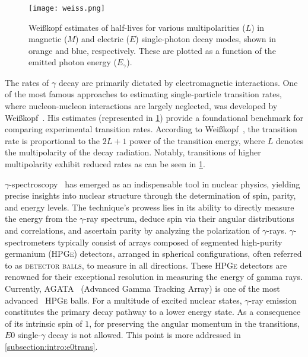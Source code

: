 \begin{figure}[hbt]
    \centering
    \texttt{[image: weiss.png]}
    \caption{Weißkopf estimates of half-lives for various multipolarities ($L$) in magnetic ($M$) and electric ($E$) single-photon decay modes, shown in orange and blue, respectively. These are plotted as a function of the emitted photon energy ($E_\gamma$).}
    \label{fig:intro:Weiss}
\end{figure}

The rates of $\gamma$ decay are primarily dictated by electromagnetic interactions. One of the most famous approaches to estimating single-particle transition rates, where nucleon-nucleon interactions are largely neglected, was developed by Weißkopf~\cite{WeisskopfTransitions}. His estimates (represented in \cref{fig:intro:Weiss}) provide a foundational benchmark for comparing experimental transition rates. According to Weißkopf~\cite{WeisskopfTransitions}, the transition rate is proportional to the $2L+1$ power of the transition energy, where $L$ denotes the 
multipolarity of the decay radiation. Notably, transitions of higher multipolarity exhibit reduced rates as can be seen in \cref{fig:intro:Weiss}.


$\gamma$-spectroscopy~\cite{Gilmore2008} has emerged as an indispensable tool in nuclear physics, yielding precise insights into nuclear structure through the determination of spin, parity, and energy levels. The technique's prowess lies in its ability to directly measure the energy from the $\gamma$-ray spectrum, deduce spin via their angular distributions and correlations, and ascertain parity by analyzing the polarization of $\gamma$-rays. 
$\gamma$-spectrometers typically consist of arrays composed of segmented high-purity germanium (\textsc{HPGe}) detectors, arranged in spherical configurations, often referred to as \textsc{detector balls}, to measure in all directions. These \textsc{HPGe} detectors are renowned for their exceptional resolution in measuring the energy of gamma rays. Currently, \textsc{AGATA}~\cite{AGATA} (Advanced Gamma Tracking Array) is one of the most advanced~\cite{KortenAGATA,EberthAGATA} \textsc{HPGe} balls.
For a multitude of excited nuclear states, $\gamma$-ray emission constitutes the primary decay pathway to a lower energy state. As a consequence of its intrinsic spin of $1$, for preserving the angular momentum in the transitions, $E0$ single-$\gamma$ decay is not allowed. This point is more addressed in \cref{subsection:intro:e0trans}.

